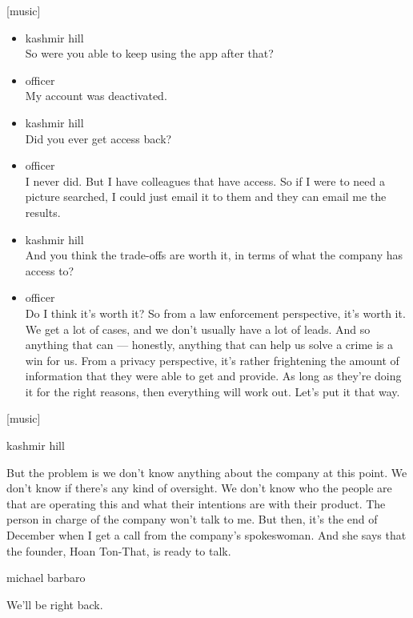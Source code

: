{[}music{]}

\begin{itemize}
\item
  kashmir hill\\
  So were you able to keep using the app after that?
\item
  officer\\
  My account was deactivated.
\item
  kashmir hill\\
  Did you ever get access back?
\item
  officer\\
  I never did. But I have colleagues that have access. So if I were to
  need a picture searched, I could just email it to them and they can
  email me the results.
\item
  kashmir hill\\
  And you think the trade-offs are worth it, in terms of what the
  company has access to?
\item
  officer\\
  Do I think it's worth it? So from a law enforcement perspective, it's
  worth it. We get a lot of cases, and we don't usually have a lot of
  leads. And so anything that can --- honestly, anything that can help
  us solve a crime is a win for us. From a privacy perspective, it's
  rather frightening the amount of information that they were able to
  get and provide. As long as they're doing it for the right reasons,
  then everything will work out. Let's put it that way.
\end{itemize}

{[}music{]}

kashmir hill

But the problem is we don't know anything about the company at this
point. We don't know if there's any kind of oversight. We don't know who
the people are that are operating this and what their intentions are
with their product. The person in charge of the company won't talk to
me. But then, it's the end of December when I get a call from the
company's spokeswoman. And she says that the founder, Hoan Ton-That, is
ready to talk.

michael barbaro

We'll be right back.

